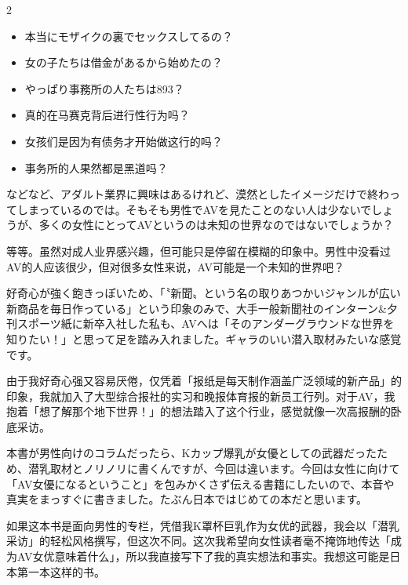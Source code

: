 \documentclass[12pt,UTF8]{ctexbook}
\begin{document}
\begin{paracol}{2}
\switchcolumn*

\begin{itemize}
	\item 本当にモザイクの裏でセックスしてるの？
	\item 女の子たちは借金があるから始めたの？
	\item やっぱり事務所の人たちは893？
\end{itemize}

\switchcolumn

\begin{itemize}
	\item 真的在马赛克背后进行性行为吗？
	\item 女孩们是因为有债务才开始做这行的吗？
	\item 事务所的人果然都是黑道吗？
\end{itemize}

\switchcolumn*

などなど、アダルト業界に興味はあるけれど、漠然としたイメージだけで終わってしまっているのでは。そもそも男性でAVを見たことのない人は少ないでしょうが、多くの女性にとってAVというのは未知の世界なのではないでしょうか？

\switchcolumn

等等。虽然对成人业界感兴趣，但可能只是停留在模糊的印象中。男性中没看过AV的人应该很少，但对很多女性来说，AV可能是一个未知的世界吧？

\switchcolumn*

好奇心が強く飽きっぽいため、「〝新聞〟という名の取りあつかいジャンルが広い新商品を毎日作っている」という印象のみで、大手一般新聞社のインターン\&夕刊スポーツ紙に新卒入社した私も、AVへは「そのアンダーグラウンドな世界を知りたい！」と思って足を踏み入れました。ギャラのいい潜入取材みたいな感覚です。

\switchcolumn

由于我好奇心强又容易厌倦，仅凭着「报纸是每天制作涵盖广泛领域的新产品」的印象，我就加入了大型综合报社的实习和晚报体育报的新员工行列。对于AV，我抱着「想了解那个地下世界！」的想法踏入了这个行业，感觉就像一次高报酬的卧底采访。

\switchcolumn*

本書が男性向けのコラムだったら、Kカップ爆乳が女優としての武器だったため、潜乳取材とノリノリに書くんですが、今回は違います。今回は女性に向けて「AV女優になるということ」を包みかくさず伝える書籍にしたいので、本音や真実をまっすぐに書きました。たぶん日本ではじめての本だと思います。

\switchcolumn

如果这本书是面向男性的专栏，凭借我K罩杯巨乳作为女优的武器，我会以「潜乳采访」的轻松风格撰写，但这次不同。这次我希望向女性读者毫不掩饰地传达「成为AV女优意味着什么」，所以我直接写下了我的真实想法和事实。我想这可能是日本第一本这样的书。


\end{paracol}
\end{document}
